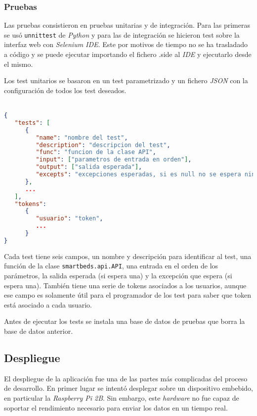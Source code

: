 \subsubsection{Pruebas}
Las pruebas consistieron en pruebas unitarias y de integración. Para las primeras se usó \texttt{unnittest} de \textit{Python} y para las de integración se hicieron test sobre la interfaz web con \textit{Selenium IDE}. Este por motivos de tiempo no se ha trasladado a código y se puede ejecutar importando el fichero .side al \textit{IDE} y ejecutarlo desde el mismo.

Los test unitarios se basaron en un test parametrizado y un fichero \textit{JSON} con la configuración de todos los test deseados.
\\\\ %
\begin{lstlisting}[language=JSON]
{
   "tests": [
      {
         "name": "nombre del test",
         "description": "descripcion del test",
         "func": "funcion de la clase API",
         "input": ["parametros de entrada en orden"],
         "output": ["salida esperada"],
         "excepts": "excepciones esperadas, si es null no se espera ninguna"
      },
      ...
   ],
   "tokens": 
      {
         "usuario": "token",
         ...
      }
}
\end{lstlisting}

Cada test tiene seis campos, un nombre y descripción para identificar al test, una función de la clase \texttt{smartbeds.api.API}, una entrada en el orden de los parámetros, la salida esperada (si espera una) y la excepción que espera (si espera una). También tiene una serie de tokens asociados a los usuarios, aunque ese campo es solamente útil para el programador de los test para saber que token está asociado a cada usuario.

Antes de ejecutar los tests se instala una base de datos de pruebas que borra la base de datos anterior.

\subsection{Despliegue}
El despliegue de la aplicación fue una de las partes más complicadas del proceso de desarrollo. En primer lugar se intentó desplegar sobre un dispositivo embebido, en particular la \textit{Raspberry Pi 2B}. Sin embargo, este \textit{hardware} no fue capaz de soportar el rendimiento necesario para enviar los datos en un tiempo real.

